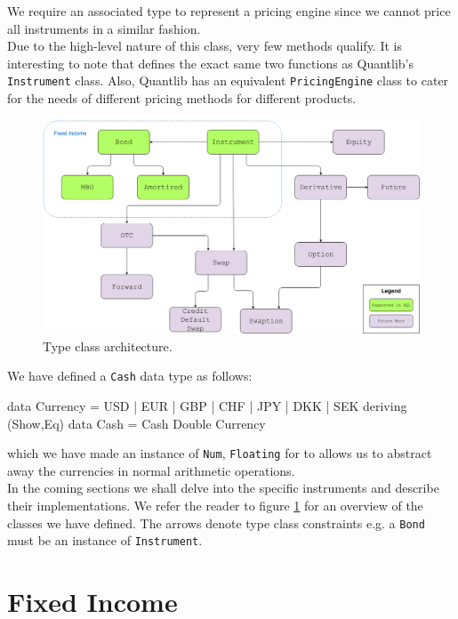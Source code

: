 We require an associated type to represent a pricing engine since we
cannot price all instruments in a similar fashion.\\

Due to the high-level nature of this class, very few methods qualify.
It is interesting to note that \hql defines the
exact same two functions as Quantlib's \texttt{Instrument}
class\cite{implql}. Also, Quantlib has an equivalent \texttt{PricingEngine}
class to cater for the needs of different pricing methods for different
products.\\

\begin{figure}[!h]
\centering
\includegraphics[scale=.3]{images/classhier.png}
\caption{Type class architecture.}
\label{fig:classhier}
\end{figure}

We have defined a \texttt{Cash} data type as follows:

\begin{hscode}
data Currency = USD | EUR | GBP | CHF | JPY | DKK | SEK deriving (Show,Eq)
data Cash = Cash Double Currency
\end{hscode}

which we have made an instance of \texttt{Num}, \texttt{Floating} for to
allows us to abstract away the currencies in normal arithmetic operations.\\

In the coming sections we shall delve into the specific instruments and
describe their implementations. We refer the reader to figure \ref{fig:classhier}
for an overview of the classes we have defined. The arrows denote type class
constraints e.g. a \texttt{Bond} must be an instance of \texttt{Instrument}.

\section{Fixed Income}\label{sec:fi}

